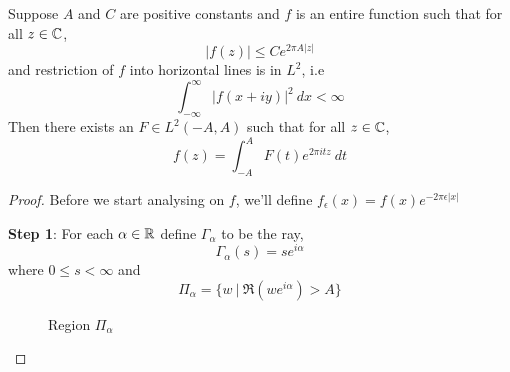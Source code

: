 \begin{theorem}
  \label{thm:paley_wiener_2}
  Suppose $A$ and $C$ are positive constants and $f$ is an entire function such that for all $z \in \mathbb C$, $$|f(z)| \le Ce^{2\pi A |z|}$$
  and restriction of $f$ into horizontal lines is in $L^2$, i.e $$\int_{-\infty}^\infty |f(x +iy)|^2 \ dx < \infty$$
  Then there exists an $F \in L^2(-A, A)$ such that for all $z\in \mathbb C$, $$f(z) = \int_{-A}^A F(t)e^{2 \pi it z} \ dt $$
\end{theorem}
\begin{proof}
  Before we start analysing on $f$, we'll define $f_\epsilon(x) = f(x)e^{-2\pi \epsilon |x|}$

  \textbf{Step 1}: For each $\alpha \in \mathbb R$ define $\Gamma_\alpha$ to be the ray, $$\Gamma_\alpha(s) = se^{i\alpha}$$
  where $0\le s <\infty$ and $$\Pi_\alpha = \{w\ | \ \Re(we^{i\alpha}) > A\}$$

   \begin{figure}[h]
     \centering
      \caption{Region $\Pi_\alpha$}
    \end{figure}


\end{proof}
